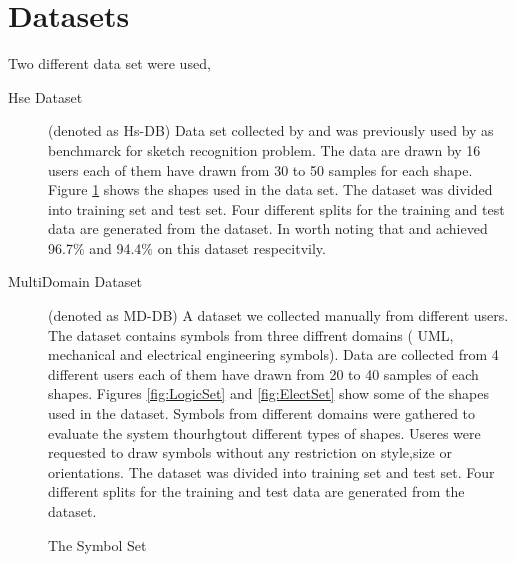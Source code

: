 \section{Datasets}
\label{sec:Datasets}
Two different data set were used, 
\begin{description}
	\item [Hse Dataset] (denoted as Hs-DB) Data set collected by \cite{HeloiseBeautification} and was previously used by \cite{Oltmans07} as benchmarck for sketch recognition problem. The data are drawn by 16 users each of them have drawn from 30 to 50 samples for each shape. Figure \ref{fig:symbolSet} shows the shapes used in the data set. The dataset was divided into training set and test set. Four different splits for the training and test data are generated from the dataset. In worth noting that \cite{HeloiseBeautification} and \cite{Oltmans07} achieved 96.7\% and  94.4\%  on this dataset respecitvily. %
		\item [MultiDomain Dataset] (denoted as MD-DB) A dataset we collected manually from different users. The dataset contains symbols from three diffrent domains ( UML, mechanical and electrical engineering symbols). Data are collected from 4 different users each of them have drawn from 20 to 40 samples of each shapes. Figures \ref{fig:LogicSet} and \ref{fig:ElectSet} show some of the shapes used in the dataset. Symbols from different domains were gathered to evaluate the system thourhgtout different types of shapes. Useres were requested to draw symbols without any restriction on style,size or orientations. The dataset was divided into training set and test set. Four different splits for the training and test data are generated from the dataset. %
\end{description}
\begin{figure}[]\centering
{}
	\caption{The Symbol Set}
	\label{fig:symbolSet}
\end{figure}

